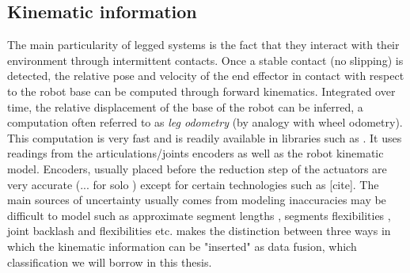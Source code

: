 \subsection{Kinematic information}
The main particularity of legged systems is the fact that they interact with their environment through intermittent contacts.
Once a stable contact (no slipping) is detected, the relative pose and velocity of the end effector in contact with respect to the robot base 
can be computed through forward kinematics. Integrated over time, the relative displacement of the base of the robot can be inferred, a computation 
often referred to as \textit{leg odometry} (by analogy with wheel odometry). This computation is very fast and is readily available in libraries such as \cite{carpentier2019pinocchio, hereid2017frost}. It uses
readings from the articulations/joints encoders as well as the robot kinematic model. Encoders, usually placed before the reduction step of the actuators
are very accurate (... for solo \cite{grimminger2020open}) except for certain technologies such as [cite]. The main sources of uncertainty usually comes from
modeling inaccuracies may be difficult to model such as approximate segment lengths , segments flexibilities \cite{vigne2018estimation}, 
joint backlash \cite{fallon2014drift} and flexibilities \cite{koolen2016design} etc. \cite{bloesch2018technical} makes the distinction between three ways in which the kinematic information can be "inserted" as data fusion, 
which classification we will borrow in this thesis. 



